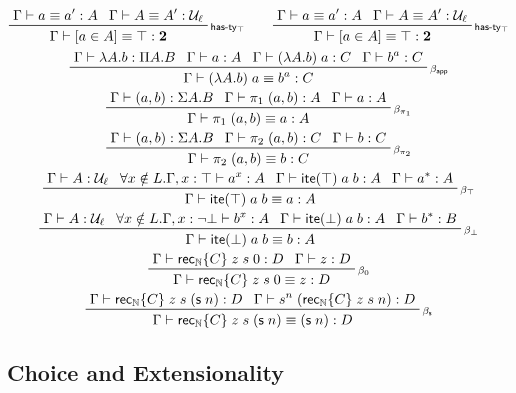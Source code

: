 \documentclass[acmsmall,screen,review]{acmart}
\newcommand{\mc}[1]{\ensuremath{\mathcal{#1}}}
\newcommand{\mb}[1]{\ensuremath{\mathbf{#1}}}
\newcommand{\ms}[1]{\ensuremath{\mathsf{#1}}}
\newcommand{\rle}[1]{{\scriptsize\textsf{#1}}}
\newcommand{\nats}{\mathbb{N}}
\newcommand{\jeq}[4]{#1 \vdash #2 \equiv #3 : #4}
\newcommand{\hasty}[3]{#1 \vdash #2 : #3}
\newcommand{\dite}[3]{\ms{ite}(#1)\;#2\;#3}
\newcommand{\natrec}[3]{\ms{rec}_\nats\{#1\}\;#2\;#3}
\newcommand{\mhasty}[2]{[#1 \in #2]}
\newcommand{\opv}[2]{#1^{#2}}
\begin{document}
\begin{gather*}
    \prftree[r]{\rle{has-ty$_\top$}}
        {\jeq{\Gamma}{a}{a'}{A}}
        {\jeq{\Gamma}{A}{A'}{\mc{U}_\ell}}
        {\jeq{\Gamma}{\mhasty{a}{A}}{\top}{\mb{2}}} \qquad
    \prftree[r]{\rle{has-ty$_\top$}}
        {\jeq{\Gamma}{a}{a'}{A}}
        {\jeq{\Gamma}{A}{A'}{\mc{U}_\ell}}
        {\jeq{\Gamma}{\mhasty{a}{A}}{\top}{\mb{2}}} \\
    \prftree[r]{\rle{$\beta_{\ms{app}}$}}
        {\hasty{\Gamma}{\lambda A . b}{\Pi A . B}}
        {\hasty{\Gamma}{a}{A}}
        {\hasty{\Gamma}{(\lambda A . b)\;a}{C}}
        {\hasty{\Gamma}{b^a}{C}}
        {\jeq{\Gamma}{(\lambda A . b)\;a}{b^a}{C}} \\
    \prftree[r]{\rle{$\beta_{\pi_1}$}}
        {\hasty{\Gamma}{(a, b)}{\Sigma A . B}}
        {\hasty{\Gamma}{\pi_1\;(a, b)}{A}}
        {\hasty{\Gamma}{a}{A}}
        {\jeq{\Gamma}{\pi_1\;(a, b)}{a}{A}} \\
    \prftree[r]{\rle{$\beta_{\pi_2}$}}
        {\hasty{\Gamma}{(a, b)}{\Sigma A . B}}
        {\hasty{\Gamma}{\pi_2\;(a, b)}{C}}
        {\hasty{\Gamma}{b}{C}}
        {\jeq{\Gamma}{\pi_2\;(a, b)}{b}{C}} \\
    \prftree[r]{\rle{$\beta_\top$}}
        {\hasty{\Gamma}{A}{\mc{U}_\ell}}
        {\forall x \notin L . \hasty{\Gamma, x : \top}{\opv{a}{x}}{A}}
        {\hasty{\Gamma}{\dite{\top}{a}{b}}{A}}
        {\hasty{\Gamma}{\opv{a}{*}}{A}}
        {\jeq{\Gamma}{\dite{\top}{a}{b}}{a}{A}} \\
    \prftree[r]{\rle{$\beta_\bot$}}
        {\hasty{\Gamma}{A}{\mc{U}_\ell}}
        {\forall x \notin L . \hasty{\Gamma, x : \lnot\bot}{\opv{b}{x}}{A}}
        {\hasty{\Gamma}{\dite{\bot}{a}{b}}{A}}
        {\hasty{\Gamma}{\opv{b}{*}}{B}}
        {\jeq{\Gamma}{\dite{\bot}{a}{b}}{b}{A}} \\
    \prftree[r]{\rle{$\beta_0$}}
        {\hasty{\Gamma}{\natrec{C}{z}{s}\;0}{D}}
        {\hasty{\Gamma}{z}{D}}
        {\jeq{\Gamma}{\natrec{C}{z}{s}\;0}{z}{D}} \\
    \prftree[r]{\rle{$\beta_{\ms{s}}$}}
        {\hasty{\Gamma}{\natrec{C}{z}{s}\;(\ms{s}\;n)}{D}}
        {\hasty{\Gamma}{\opv{s}{n}\;(\natrec{C}{z}{s}\;n)}{D}}
        {\jeq{\Gamma}{\natrec{C}{z}{s}\;(\ms{s}\;n)}{(\ms{s}\;n)}{D}} \\
\end{gather*}

\subsection{Choice and Extensionality}
\end{document}
